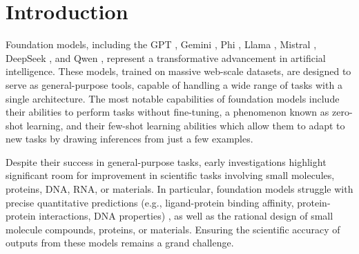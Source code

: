 \section{Introduction}
\label{sec:introduction}
Foundation models, including the GPT \cite{brown2020languagemodelsfewshotlearners,gpt4technicalreport,openai2024gpt4ocard}, Gemini \cite{geminiteam2024geminifamilyhighlycapable,geminiteam2024gemini15unlockingmultimodal}, Phi \cite{abdin2024phi3technicalreporthighly,phi4report}, Llama \cite{dubey2024llama3herdmodels}, Mistral \cite{jiang2023mistral7b,jiang2024mixtralexperts}, DeepSeek \cite{deepseekv3,deepseekai2025r1}, and Qwen \cite{yang2024qwen2technicalreport,qwen2025qwen25technicalreport}, represent a transformative advancement in artificial intelligence. %
These models, trained on massive web-scale datasets, are designed to serve as general-purpose tools, capable of handling a wide range of tasks with a single architecture. The most notable capabilities of foundation models include their abilities to perform tasks without fine-tuning, a phenomenon known as zero-shot learning, and their few-shot learning abilities which allow them to adapt to new tasks by drawing inferences from just a few examples. 

Despite their success in general-purpose tasks, early investigations \cite{ai4science2023impactlargelanguagemodels} highlight significant room for improvement in scientific tasks involving small molecules, proteins, DNA, RNA, or materials. In particular, foundation models struggle with precise quantitative predictions (e.g., ligand-protein binding affinity, protein-protein interactions, DNA properties) \cite{ai4science2023impactlargelanguagemodels}, as well as the rational design of small molecule compounds, proteins, or materials. Ensuring the scientific accuracy of outputs from these models remains a grand challenge.

